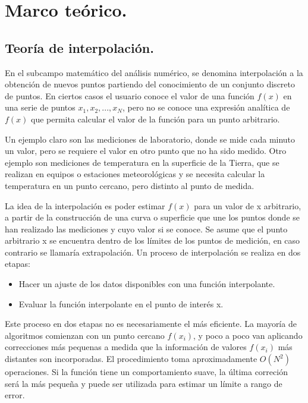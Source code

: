 \chapter{Marco te\'orico.}

\section{Teor\'ia de interpolaci\'on.}

\hspace{0.4cm} En el subcampo matem\'atico del an\'alisis num\'erico, se denomina interpolaci\'on a la obtenci\'on de nuevos puntos partiendo del conocimiento de un conjunto discreto de puntos. En ciertos casos el usuario conoce el valor de una funci\'on $f(x)$ en una serie de puntos $x_{1}, x_{2},..., x_{N}$, pero no se conoce una 
expresi\'on anal\'itica de $f(x)$ que permita calcular el valor de la funci\'on para un punto arbitrario. 

\hspace{0.4cm} Un ejemplo claro son las mediciones de laboratorio, donde se mide cada minuto un valor, pero se requiere el valor en otro punto que no ha sido medido. Otro ejemplo son mediciones de temperatura en la superficie
de la Tierra, que se realizan en equipos o estaciones meteorol\'ogicas y se necesita calcular la temperatura en un punto cercano, pero distinto al punto de medida.

\hspace{0.4cm} La idea de la interpolaci\'on es poder estimar $f(x)$ para un valor de x arbitrario, a partir de la construcci\'on de una curva o superficie que une los puntos donde se han realizado las mediciones y cuyo valor si se conoce. Se asume que el punto arbitrario x se encuentra dentro de los l\'imites de los puntos de medici\'on, en caso contrario se llamar\'ia extrapolaci\'on. Un proceso de interpolaci\'on se realiza en dos etapas:

\begin{itemize}
  \item Hacer un ajuste de los datos disponibles con una funci\'on interpolante.
  \item Evaluar la funci\'on interpolante en el punto de inter\'es x.
\end{itemize}


\hspace{0.4cm} Este proceso en dos etapas no es necesariamente el m\'as 
eficiente. La mayor\'ia de algoritmos comienzan con un punto cercano $f(x_{i})$, y poco a poco van aplicando correcciones m\'as pequenas a medida que la 
informaci\'on de valores $f(x_{i})$ m\'as distantes son incorporadas. El procedimiento toma aproximadamente $O(N^{2})$ operaciones. Si la funci\'on tiene un comportamiento suave, la \'ultima correci\'on ser\'a la m\'as peque\~na y puede ser utilizada para estimar un l\'imite a rango de error.

